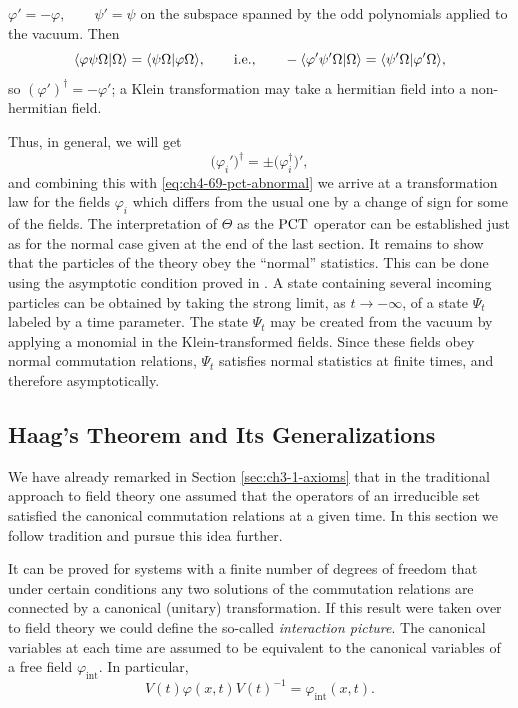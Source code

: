 \(
\varphi'=-\varphi,\qquad \psi'=\psi
\)
on the subspace spanned by the odd polynomials applied to the vacuum.  Then
\begin{equation*}
  \langle \varphi\psi\Omega\vert \Omega\rangle
  =\langle \psi\Omega\vert \varphi\Omega\rangle,
  \qquad\text{i.e.,}\qquad
  -\langle \varphi'\psi'\Omega\vert \Omega\rangle
  =\langle \psi'\Omega\vert \varphi'\Omega\rangle,
\end{equation*}
so $(\varphi')^\dagger=-\varphi'$; a Klein transformation may take a
hermitian field into a non-hermitian field.

Thus, in general, we will get
\begin{equation*}
  \bigl(\varphi_i'\bigr)^\dagger
  =\pm\bigl(\varphi_i^\dagger\bigr)',
\end{equation*}
and combining this with \eqref{eq:ch4-69-pct-abnormal} we arrive at a transformation law for the fields
$\varphi_i$ which differs from the usual one by a change of sign for some of
the fields.  The interpretation of $\Theta$ as the $\mathrm{PCT}$ operator can be
established just as for the normal case given at the end of the last section.
It remains to show that the particles of the theory obey the ``normal''
statistics. This can be done using the asymptotic condition proved in
\cite{ch4-6}.
A state containing several incoming particles can be obtained by taking the
strong limit, as $t\to-\infty$, of a state $\Psi_t$ labeled by a time
parameter.  The state $\Psi_t$ may be created from the vacuum by applying a
monomial in the Klein-transformed fields.  Since these fields obey normal
commutation relations, $\Psi_t$ satisfies normal statistics at finite times,
and therefore asymptotically.

\subsection{Haag's Theorem and Its Generalizations}
\label{sec:ch4-5-haag}

We have already remarked in Section \ref{sec:ch3-1-axioms} that in the traditional approach to
field theory one assumed that the operators of an irreducible set satisfied
the canonical commutation relations at a given time.  In this section we
follow tradition and pursue this idea further.

It can be proved for systems with a finite number of degrees of freedom that
under certain conditions any two solutions of the commutation relations are
connected by a canonical (unitary) transformation.  If this result were
taken over to field theory we could define the so-called \emph{interaction
picture}.  The canonical variables at each time are assumed to be equivalent
to the canonical variables of a free field $\varphi_{\mathrm{int}}$.  In
particular,
\begin{equation}
  V(t)\varphi(x,t)V(t)^{-1}=\varphi_{\mathrm{int}}(x,t).
  \tag{4-70}\label{eq:ch4-interaction-picture}
\end{equation}

